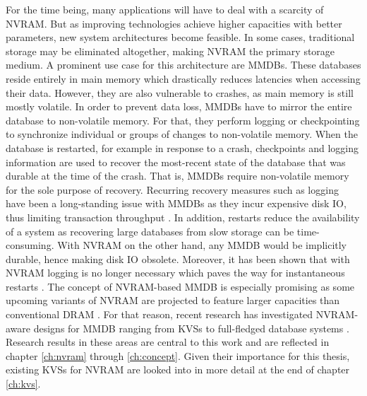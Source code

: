 For the time being, many applications will have to deal with a scarcity of
\ac{NVRAM}. But as improving technologies achieve higher capacities with better
parameters, new system architectures become feasible. In some cases, traditional
storage may be eliminated altogether, making \ac{NVRAM} the primary storage
medium. A prominent use case for this architecture are \acp{MMDB}. These
databases reside entirely in main memory which drastically reduces latencies
when accessing their data. However, they are also vulnerable to crashes, as main
memory is still mostly volatile. In order to prevent data loss, \acp{MMDB} have
to mirror the entire database to non-volatile memory. For that, they perform
logging or checkpointing to synchronize individual or groups of changes to
non-volatile memory. When the database is restarted, for example in response to
a crash, checkpoints and logging information are used to recover the most-recent
state of the database that was durable at the time of the crash. That is,
\acp{MMDB} require non-volatile memory for the sole purpose of recovery.
Recurring recovery measures such as logging have been a long-standing issue with
\acp{MMDB} as they incur expensive disk \ac{IO}, thus limiting transaction
throughput \cite{eich1986main, molina1992main, wust2012efficient,
malviya2014rethinking}. In addition, restarts reduce the availability of a
system as recovering large databases from slow storage can be time-consuming.
With \ac{NVRAM} on the other hand, any \ac{MMDB} would be implicitly durable,
hence making disk \ac{IO} obsolete. Moreover, it has been shown that with
\ac{NVRAM} logging is no longer necessary which paves the way for instantaneous
restarts \cite{oukid2015instant}. The concept of \ac{NVRAM}-based \ac{MMDB} is
especially promising as some upcoming variants of \ac{NVRAM} are projected to
feature larger capacities than conventional \ac{DRAM} \cite{lee2009architecting,
zilberberg2013phase, dulloor2014system}. For that reason, recent research has
investigated \ac{NVRAM}-aware designs for \ac{MMDB} ranging from \acp{KVS}
\cite{bailey2013exploring, zhou2016nvht, wu2016nvmcached} to full-fledged
database systems \cite{oukid2015instant, schwalb2016hyrise, andrei2017sap}.
Research results in these areas are central to this work and are reflected in
chapter \ref{ch:nvram} through \ref{ch:concept}. Given their importance for this
thesis, existing \acp{KVS} for \ac{NVRAM} are looked into in more detail at the
end of chapter \ref{ch:kvs}.

